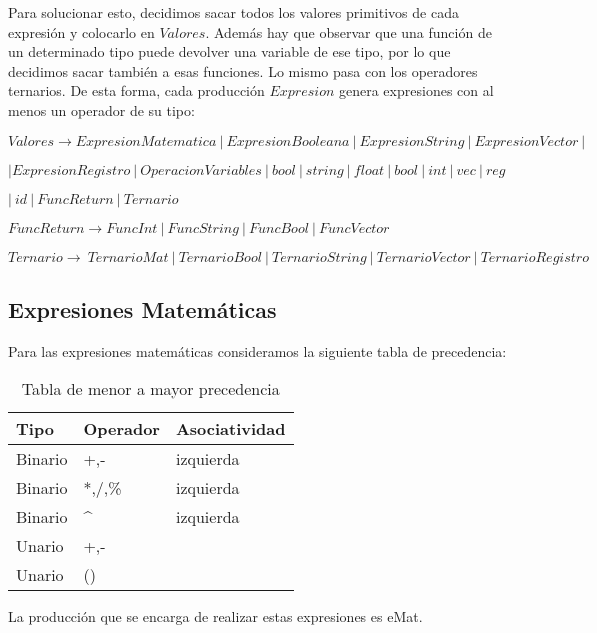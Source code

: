 Para solucionar esto, decidimos sacar todos los valores primitivos de cada expresión y colocarlo en $Valores$. Además hay que observar que una función de un determinado tipo puede devolver una variable de ese tipo, por lo que decidimos sacar también a esas funciones. Lo mismo pasa con los operadores ternarios. De esta forma, cada producción $Expresion$ genera expresiones con al menos un operador de su tipo:

$Valores \rightarrow ExpresionMatematica \ | \ ExpresionBooleana \  | \ ExpresionString \  | \ ExpresionVector \ | \  $

\hspace{15mm} $| ExpresionRegistro  \ | \ OperacionVariables \ | \ bool \ | \ string \ | \ float \ | \ bool \ | \ int \ | \ vec \ | \ reg  $

\hspace{15mm} $| \ id \ | \ FuncReturn \ | \ Ternario $

$FuncReturn \rightarrow FuncInt \ | \ FuncString \ | \ FuncBool \ | \ FuncVector $

$Ternario \rightarrow  \ TernarioMat \ | \ TernarioBool \ | \ TernarioString \ | \ TernarioVector \ | \ TernarioRegistro $


\subsection{Expresiones Matemáticas}
Para las expresiones matemáticas consideramos la siguiente tabla de precedencia:

\begin{table}[htbp]
\begin{center}
\begin{tabular}{|l|l|l|}
\hline
Tipo & Operador & Asociatividad \\
\hline \hline
Binario & +,- & izquierda \\ \hline
Binario & *,/,\% & izquierda \\ \hline
Binario & \^{} & izquierda \\ \hline
Unario & +,- &  \\ \hline
Unario & () &  \\ \hline

\end{tabular}
\caption{Tabla de menor a mayor precedencia}
\label{Precedencia}
\end{center}
\end{table}

La producción que se encarga de realizar estas expresiones es eMat. 

